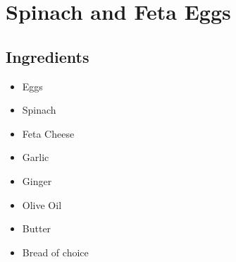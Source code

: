 \thispagestyle{fancy}
\section{Spinach and Feta Eggs}
\AddToShipoutPicture*{\FetaSpinachEggs}

\subsection*{Ingredients}
\begin{multicols}{3}
	\begin{itemize}
		\item Eggs
		\item Spinach
		\item Feta Cheese
		\item Garlic
		\item Ginger
		\item Olive Oil
		\item Butter
		\item Bread of choice
	\end{itemize}
\end{multicols}